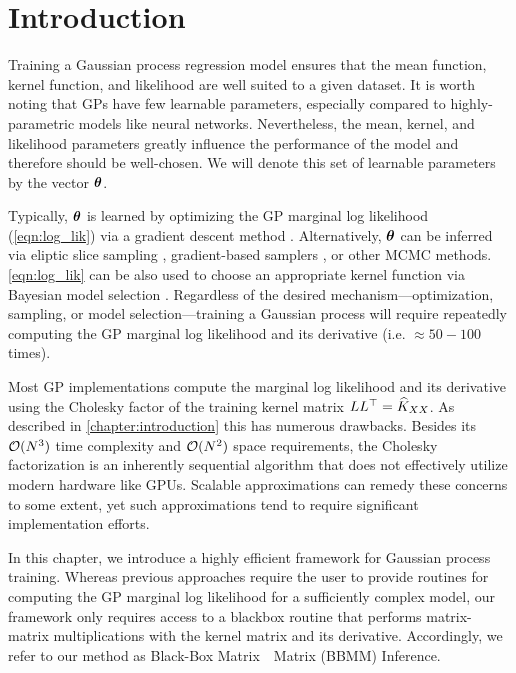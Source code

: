 \section{Introduction}

Training a Gaussian process regression model ensures that the mean function, kernel function, and likelihood are well suited to a given dataset.
It is worth noting that GPs have few learnable parameters, especially compared to highly-parametric models like neural networks.
Nevertheless, the mean, kernel, and likelihood parameters greatly influence the performance of the model and therefore should be well-chosen.
We will denote this set of learnable parameters by the vector $\boldsymbol{\theta}$.

Typically, $\boldsymbol{\theta}$ is learned by optimizing the GP marginal log likelihood (\cref{eqn:log_lik}) via a gradient descent method \cite{rasmussen2006gaussian}.
Alternatively, $\boldsymbol{\theta}$ can be inferred via eliptic slice sampling \cite{murray2010elliptical}, gradient-based samplers \cite{havasi2018inference}, or other MCMC methods.
\cref{eqn:log_lik} can be also used to choose an appropriate kernel function via Bayesian model selection \cite{rasmussen2006gaussian,duvenaud2013structure}.
Regardless of the desired mechanism---optimization, sampling, or model selection---training a Gaussian process will require repeatedly computing the GP marginal log likelihood and its derivative (i.e. $\approx50-100$ times).

Most GP implementations compute the marginal log likelihood and its derivative using the Cholesky factor of the training kernel matrix $L L^\top = \widehat{K}_{XX}$.
As described in \cref{chapter:introduction} this has numerous drawbacks.
Besides its $\bigo{N^3}$ time complexity and $\bigo{N^2}$ space requirements, the Cholesky factorization is an inherently sequential algorithm that does not effectively utilize modern hardware like GPUs.
Scalable approximations can remedy these concerns to some extent, yet such approximations tend to require significant implementation efforts.

In this chapter, we introduce a highly efficient framework for Gaussian process training.
Whereas previous approaches require the user to provide routines for computing the GP marginal log likelihood for a sufficiently complex model,
our framework only requires access to a blackbox routine that performs matrix-matrix multiplications with the kernel matrix and its derivative.
Accordingly, we refer to our method as Black-Box Matrix~\texttimes~Matrix (BBMM) Inference.

